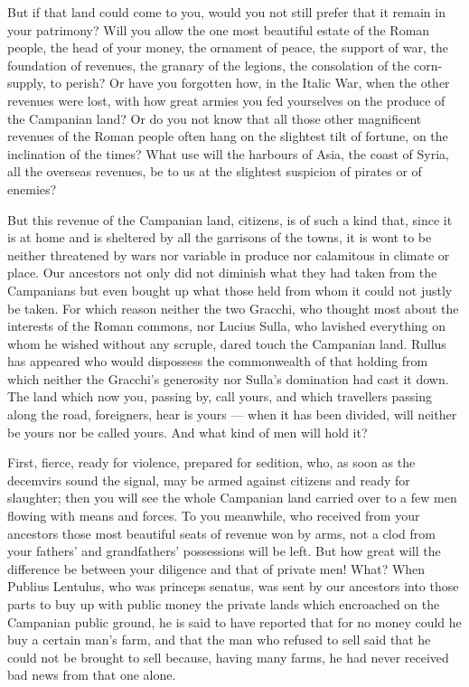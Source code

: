  But if that land could come to you, would you not still prefer that it remain in your patrimony? Will you allow the one most beautiful estate of the Roman people, the head of your money, the ornament of peace, the support of war, the foundation of revenues, the granary of the legions, the consolation of the corn-supply, to perish? Or have you forgotten how, in the Italic War, when the other revenues were lost, with how great armies you fed yourselves on the produce of the Campanian land? Or do you not know that all those other magnificent revenues of the Roman people often hang on the slightest tilt of fortune, on the inclination of the times? What use will the harbours of Asia, the coast of Syria, all the overseas revenues, be to us at the slightest suspicion of pirates or of enemies?

 But this revenue of the Campanian land, citizens, is of such a kind that, since it is at home and is sheltered by all the garrisons of the towns, it is wont to be neither threatened by wars nor variable in produce nor calamitous in climate or place. Our ancestors not only did not diminish what they had taken from the Campanians but even bought up what those held from whom it could not justly be taken. For which reason neither the two Gracchi, who thought most about the interests of the Roman commons, nor Lucius Sulla, who lavished everything on whom he wished without any scruple, dared touch the Campanian land. Rullus has appeared who would dispossess the commonwealth of that holding from which neither the Gracchi's generosity nor Sulla's domination had cast it down. The land which now you, passing by, call yours, and which travellers passing along the road, foreigners, hear is yours --- when it has been divided, will neither be yours nor be called yours. And what kind of men will hold it?

 First, fierce, ready for violence, prepared for sedition, who, as soon as the decemvirs sound the signal, may be armed against citizens and ready for slaughter; then you will see the whole Campanian land carried over to a few men flowing with means and forces. To you meanwhile, who received from your ancestors those most beautiful seats of revenue won by arms, not a clod from your fathers' and grandfathers' possessions will be left. But how great will the difference be between your diligence and that of private men! What? When Publius Lentulus, who was princeps senatus, was sent by our ancestors into those parts to buy up with public money the private lands which encroached on the Campanian public ground, he is said to have reported that for no money could he buy a certain man's farm, and that the man who refused to sell said that he could not be brought to sell because, having many farms, he had never received bad news from that one alone.

